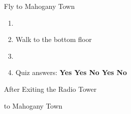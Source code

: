 \begin{paracol}{2}
\switchcolumn*
\vspace{-2mm}
\begin{story}{Fly to Mahogany Town}
	\varwb
	\varwe
\end{story}

\switchcolumn
\begin{enumerate}[resume]
	\item {}
	\item Walk to the bottom floor
	\item {}
	\item Quiz answers: \textbf{Yes \pointRight{} Yes \pointRight{} No \pointRight{} Yes \pointRight{} No}
\end{enumerate}

\begin{menu}{After Exiting the Radio Tower}
	\varwb
	\begin{pokeMenu}
		\item {} \fly{} to Mahogany Town \menuHlTwo{(2\pointDown)}
	\end{pokeMenu}
	\varwe
\end{menu}

\newpage
\end{paracol}
\vspace{3.5mm}